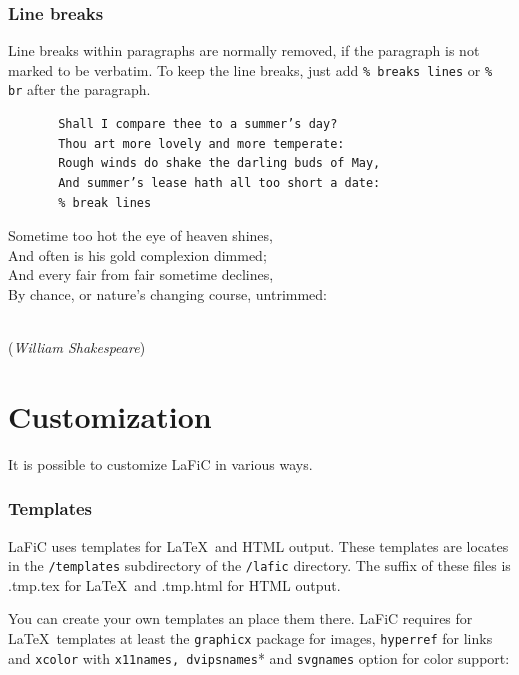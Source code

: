 \documentclass{article}
\begin{document}
\section{Line breaks}

{Line breaks within paragraphs are normally removed, if the
paragraph is not marked to be verbatim. To keep the line
breaks, just add \texttt{\% breaks lines} or \texttt{\% br} after the paragraph.\\}

\begin{verbatim}
       Shall I compare thee to a summer’s day?
       Thou art more lovely and more temperate:
       Rough winds do shake the darling buds of May,
       And summer’s lease hath all too short a date:
       % break lines
\end{verbatim}


{Sometime too hot the eye of heaven shines,\\
And often is his gold complexion dimmed;\\
And every fair from fair sometime declines,\\
By chance, or nature’s changing course, untrimmed:\\\\}

{\raggedleft%
(\emph{William Shakespeare})\\}

\part{Customization}

{It is possible to customize LaFiC in various ways.\\}

\section{Templates}

{LaFiC uses templates for \LaTeX\  and HTML output. These
templates are locates in the \texttt{/templates} subdirectory of the
\texttt{/lafic} directory. The suffix of these files is .tmp.tex for
\LaTeX\  and .tmp.html for HTML output.\\}

{You can create your own templates an place them there. LaFiC
requires for \LaTeX\  templates at least the \texttt{graphicx} package
for images, \texttt{hyperref} for links and \texttt{xcolor} with \texttt{x11names, dvipsnames}*
and \texttt{svgnames} option for color support:\\}
\end{document}
